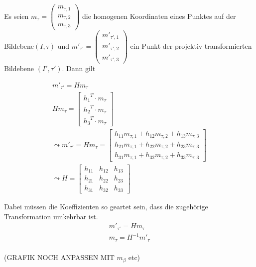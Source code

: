 Es seien \ensuremath{m_{\tau} = \begin{pmatrix}
		m_{\tau,1}\\m_{\tau,2}\\m_{\tau,3}
\end{pmatrix}} die homogenen Koordinaten eines Punktes auf der Bildebene$(I,\tau)$ und \ensuremath{m'_{\tau'} = \begin{pmatrix}
m'_{\tau',1}\\m'_{\tau',2}\\m'_{\tau',3}
\end{pmatrix}} ein Punkt der projektiv transformierten Bildebene $(I',\tau')$. Dann gilt

\begin{gather}
	m'_{\tau'} = Hm_{\tau}\\
	Hm_{\tau} = \begin{bmatrix}
	{h_1}^T \cdot m_{\tau}\\{h_2}^T \cdot m_{\tau}\\{h_3}^T \cdot m_{\tau}
	\end{bmatrix} \\
	\leadsto 
	m'_{\tau'}= Hm_{\tau}= \begin{bmatrix}
	h_{11}m_{\tau,1}+h_{12}m_{\tau,2}+h_{13}m_{\tau,3}\\
	h_{21}m_{\tau,1}+h_{22}m_{\tau,2}+h_{23}m_{\tau,3}\\
	h_{31}m_{\tau,1}+h_{32}m_{\tau,2}+h_{33}m_{\tau,3}
	\end{bmatrix}\\
	\leadsto 
	H=\begin{bmatrix}
	h_{11}&h_{12}&h_{13}\\
	h_{21}&h_{22}&h_{23}\\
	h_{31}&h_{32}&h_{33}
	\end{bmatrix}
\end{gather}

Dabei müssen die Koeffizienten so geartet sein, dass die zugehörige Transformation umkehrbar ist\cite{HZ}\cite{Peiffer}.
\begin{gather}
	m'_{\tau'}=Hm_\tau\\
	m_\tau= H^{-1}m'_{\tau}
\end{gather}\\


(GRAFIK NOCH ANPASSEN MIT $m_\beta$ etc)\\


